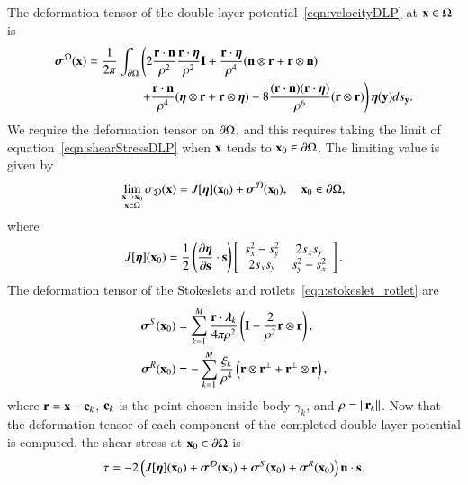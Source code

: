 \documentclass[preprint, 10pt]{elsarticle}
\begin{document}
The deformation tensor of the double-layer
potential~\eqref{eqn:velocityDLP} at ${\mathbf{x}} \in \Omega$ is
\begin{equation}
  \label{eqn:shearStressDLP}
  \begin{aligned}
  {\boldsymbol\sigma}^{\mathcal{D}}({\mathbf{x}}) = \frac{1}{2\pi}\int_{{\partial}\Omega} &\left(
    2\frac{{\mathbf{r}} \cdot {\mathbf{n}}}{\rho^2} \frac{{\mathbf{r}} \cdot {\boldsymbol\eta}}{\rho^2} {\mathbf{I}} + 
    \frac{{\mathbf{r}} \cdot {\boldsymbol\eta}}{\rho^4} ({\mathbf{n}} \otimes {\mathbf{r}} + {\mathbf{r}} \otimes {\mathbf{n}}) 
    \right. \\
    &\left.
    +\frac{{\mathbf{r}} \cdot {\mathbf{n}}}{\rho^4} ({\boldsymbol\eta} \otimes {\mathbf{r}} + {\mathbf{r}} \otimes {\boldsymbol\eta}) - 
    8\frac{({\mathbf{r}} \cdot {\mathbf{n}})({\mathbf{r}} \cdot {\boldsymbol\eta})}{\rho^6}({\mathbf{r}} \otimes {\mathbf{r}})
  \right) {\boldsymbol\eta}({\mathbf{y}}) ds_{\mathbf{y}}.
  \end{aligned}
\end{equation}
We require the deformation tensor on ${\partial}\Omega$, and this requires
taking the limit of equation~\eqref{eqn:shearStressDLP} when ${\mathbf{x}}$ tends
to ${\mathbf{x}}_0 \in {\partial}\Omega$.  The limiting value is given
by~\cite{qua-bir2014a}
\begin{align*}
  \lim_{\substack{{\mathbf{x}} \rightarrow {\mathbf{x}}_0 \\ {\mathbf{x}} \in \Omega}}\sigma_{\mathcal{D}}({\mathbf{x}}) =
  J[{\boldsymbol\eta}]({\mathbf{x}}_0) + {\boldsymbol\sigma}^{\mathcal{D}}({\mathbf{x}}_0), \quad {\mathbf{x}}_0 \in {\partial}\Omega,
\end{align*} 
where
\begin{align}
  J[{\boldsymbol\eta}]({\mathbf{x}}_0) = \frac{1}{2}\left(\frac{\partial {\boldsymbol\eta}}{\partial {\mathbf{s}}} 
    \cdot {\mathbf{s}}\right) \left[ 
  \begin{array}{cc}
    s_x^2 - s_y^2 & 2s_x s_y \\ 2s_x s_y & s_y^2 - s_x^2
  \end{array}\right].
  \label{eqn:shearStressJump}
\end{align}
The deformation tensor of the Stokeslets and
rotlets~\eqref{eqn:stokeslet_rotlet} are
\begin{equation}
  \label{eqn:shearStressSR}
  \begin{aligned}
  {\boldsymbol\sigma}^S({\mathbf{x}}_0) &= \sum_{k=1}^{M}
    \frac{{\mathbf{r}} \cdot {\boldsymbol\lambda}_k}{4\pi\rho^2} \left(
    {\mathbf{I}} - \frac{2}{\rho^2} {\mathbf{r}} \otimes {\mathbf{r}} \right),  \\
  {\boldsymbol\sigma}^R({\mathbf{x}}_0) &= -\sum_{k=1}^M
    \frac{\xi_k}{\rho^4} \left({\mathbf{r}} \otimes {\mathbf{r}}^\perp + 
    {\mathbf{r}}^\perp \otimes {\mathbf{r}} \right),
  \end{aligned}
\end{equation}
where ${\mathbf{r}} = {\mathbf{x}} - {\mathbf{c}}_k$, ${\mathbf{c}}_k$ is the point chosen inside body
$\gamma_k$, and $\rho = \|{\mathbf{r}}_k\|$.  Now that the deformation tensor of
each component of the completed double-layer potential is computed, the
shear stress at ${\mathbf{x}}_0 \in {\partial}\Omega$ is
\begin{align*}
  \tau = -2 \left(J[{\boldsymbol\eta}]({\mathbf{x}}_0) + {\boldsymbol\sigma}^{\mathcal{D}}({\mathbf{x}}_0) + 
    {\boldsymbol\sigma}^S({\mathbf{x}}_0) + {\boldsymbol\sigma}^R({\mathbf{x}}_0)\right) {\mathbf{n}} \cdot {\mathbf{s}}.
\end{align*}
\end{document}
